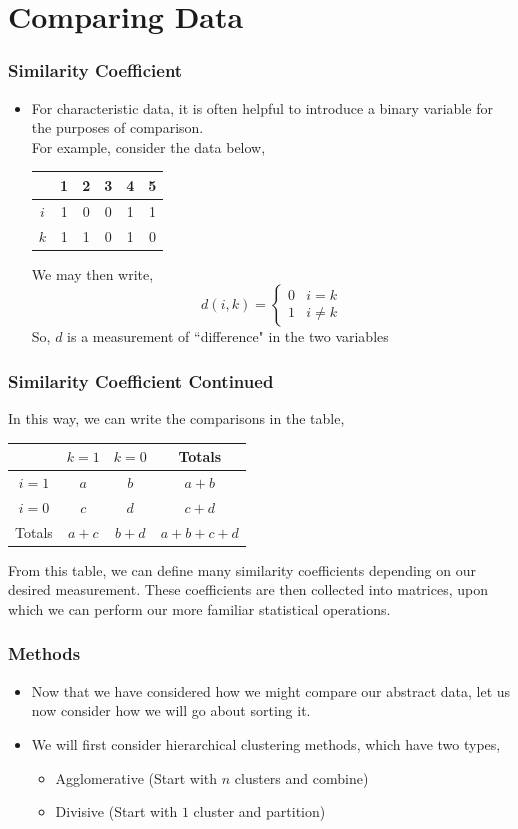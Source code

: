\documentclass{beamer}
\begin{document}
\section{Comparing Data}
\begin{frame}
\frametitle{Similarity Coefficient}
\begin{itemize}
\item For characteristic data, it is often helpful to introduce a binary variable for the purposes of comparison.\\
\pause
For example, consider the data below,
\begin{center}
\begin{tabular}{c|ccccc}
& 1 & 2 & 3 & 4 & 5\\\hline
$i$ & 1 & 0 & 0 & 1 & 1\\
$k$ & 1 & 1 & 0 & 1 & 0
\end{tabular}
\end{center}
\pause
We may then write,
\[d(i,k)=\begin{cases}
0 & i=k\\
1 & i\neq k
\end{cases}\]\pause
So, $d$ is a measurement of ``difference" in the two variables
\end{itemize}
\end{frame}
\begin{frame}
\frametitle{Similarity Coefficient Continued}
In this way, we can write the comparisons in the table,
\begin{center}
\begin{tabular}{c|cc|c}
& $k=1$ & $k=0$ & Totals\\\hline
$i=1$ & $a$ & $b$ & $a+b$\\
$i=0$ & $c$ & $d$ & $c+d$\\\hline
Totals & $a+c$ & $b+d$ & $a+b+c+d$
\end{tabular}
\end{center}
\pause
From this table, we can define many similarity coefficients depending on our desired measurement. These coefficients are then collected into matrices, upon which we can perform our more familiar statistical operations.
\end{frame}
\begin{frame}
\frametitle{Methods}
\begin{itemize}
\item Now that we have considered how we might compare our abstract data, let us now consider how we will go about sorting it.
\pause
\item We will first consider hierarchical clustering methods, which have two types,
\pause
\begin{itemize}
\item Agglomerative (Start with $n$ clusters and combine)\\
\item Divisive (Start with $1$ cluster and partition)
\end{itemize}
\end{itemize}
\end{frame}
\end{document}
